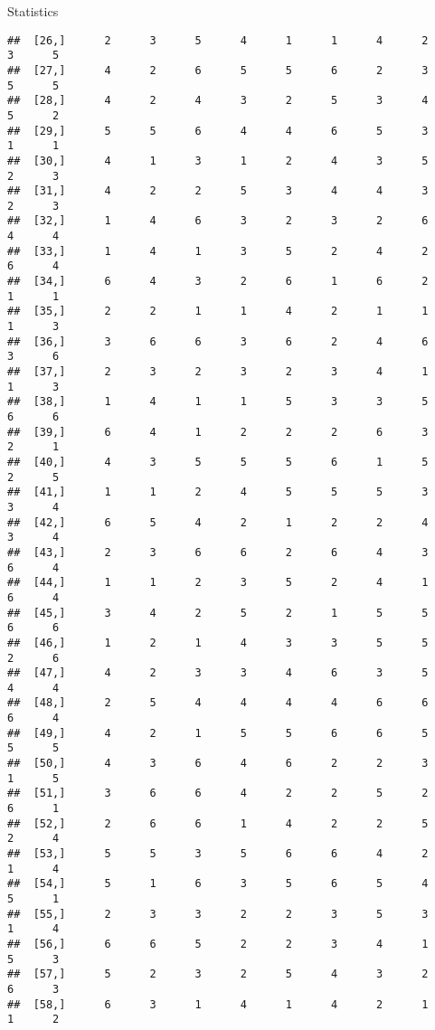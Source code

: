 \documentclass[
  ignorenonframetext,
]{beamer}
\begin{document}
\begin{frame}[fragile]{Statistics}
\begin{verbatim}
##  [26,]      2      3      5      4      1      1      4      2      3      5
##  [27,]      4      2      6      5      5      6      2      3      5      5
##  [28,]      4      2      4      3      2      5      3      4      5      2
##  [29,]      5      5      6      4      4      6      5      3      1      1
##  [30,]      4      1      3      1      2      4      3      5      2      3
##  [31,]      4      2      2      5      3      4      4      3      2      3
##  [32,]      1      4      6      3      2      3      2      6      4      4
##  [33,]      1      4      1      3      5      2      4      2      6      4
##  [34,]      6      4      3      2      6      1      6      2      1      1
##  [35,]      2      2      1      1      4      2      1      1      1      3
##  [36,]      3      6      6      3      6      2      4      6      3      6
##  [37,]      2      3      2      3      2      3      4      1      1      3
##  [38,]      1      4      1      1      5      3      3      5      6      6
##  [39,]      6      4      1      2      2      2      6      3      2      1
##  [40,]      4      3      5      5      5      6      1      5      2      5
##  [41,]      1      1      2      4      5      5      5      3      3      4
##  [42,]      6      5      4      2      1      2      2      4      3      4
##  [43,]      2      3      6      6      2      6      4      3      6      4
##  [44,]      1      1      2      3      5      2      4      1      6      4
##  [45,]      3      4      2      5      2      1      5      5      6      6
##  [46,]      1      2      1      4      3      3      5      5      2      6
##  [47,]      4      2      3      3      4      6      3      5      4      4
##  [48,]      2      5      4      4      4      4      6      6      6      4
##  [49,]      4      2      1      5      5      6      6      5      5      5
##  [50,]      4      3      6      4      6      2      2      3      1      5
##  [51,]      3      6      6      4      2      2      5      2      6      1
##  [52,]      2      6      6      1      4      2      2      5      2      4
##  [53,]      5      5      3      5      6      6      4      2      1      4
##  [54,]      5      1      6      3      5      6      5      4      5      1
##  [55,]      2      3      3      2      2      3      5      3      1      4
##  [56,]      6      6      5      2      2      3      4      1      5      3
##  [57,]      5      2      3      2      5      4      3      2      6      3
##  [58,]      6      3      1      4      1      4      2      1      1      2

\end{verbatim}
\end{frame}
\end{document}
